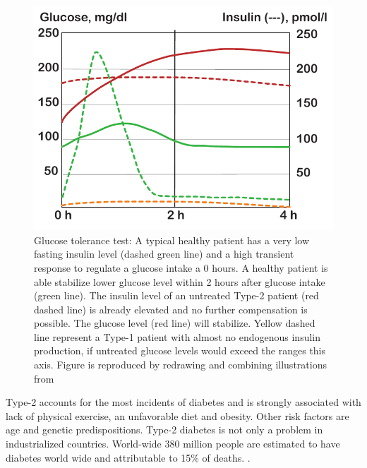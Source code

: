 \begin{figure}[ht]
\label{intro_glucoseTolerance}
\includegraphics{graphics/glucoseTolerance.pdf}
\caption{Glucose tolerance test: A typical healthy patient has a very low fasting insulin level (dashed green line) and a high transient response to regulate a glucose intake a 0 hours. A healthy patient is able stabilize lower glucose level within 2 hours after glucose intake (green line). The insulin level of an untreated Type-2 patient (red dashed line) is already elevated and no further compensation is possible. The glucose level (red line) will stabilize. Yellow dashed line represent a Type-1 patient with almost no endogenous insulin production, if untreated glucose levels would exceed the ranges this axis. Figure is reproduced by redrawing and combining illustrations from \cite{silverthorn2010human,caumo2004first}}
\end{figure}

Type-2 accounts for the most incidents of diabetes and is strongly associated with lack of physical exercise, an unfavorable diet and obesity. Other risk factors are age and genetic predispositions. Type-2 diabetes is not only a problem in industrialized countries.  World-wide 380 million people are estimated to have diabetes world wide and attributable to 15\% of deaths. \cite{aguiree2013idf}.

